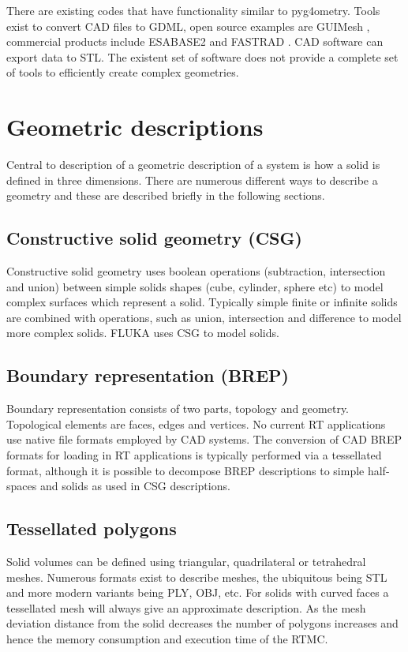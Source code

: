 \documentclass[final,5p,times,twocolumn]{elsarticle}
\begin{document}
There are existing codes that have functionality similar to pyg4ometry. Tools exist to convert CAD files to GDML, open source examples are GUIMesh \cite{GUIMesh_Pinto}, 
commercial products include ESABASE2 \cite{ESABASE2} and FASTRAD \cite{FASTRAD}. 
CAD software can export data to STL. The existent set of software does not provide a complete set of tools to efficiently create complex geometries.   

\section{Geometric descriptions} \label{sec:geometric}
Central to description of a geometric description of a system is how a solid is defined in three dimensions. There are numerous different ways to describe a
geometry and these are described briefly in the following sections.  

\subsection{Constructive solid geometry (CSG)}
Constructive solid geometry uses boolean operations (subtraction, intersection and union) between simple solids shapes (cube, cylinder, sphere etc) to model complex 
surfaces which represent a solid. Typically simple finite or infinite solids are combined with operations, such as union, intersection and difference to model more 
complex solids. FLUKA uses CSG to model solids.

\subsection{Boundary representation (BREP)}
Boundary representation consists of two parts, topology and geometry. Topological elements are faces, edges and vertices. No current RT applications use native 
file formats employed by CAD systems. The conversion of CAD BREP formats for loading in RT applications is typically performed via a tessellated format, although it 
is possible to decompose BREP descriptions to simple half-spaces and solids as used in CSG descriptions. 

\subsection{Tessellated polygons}
Solid volumes can be defined using triangular, quadrilateral or tetrahedral meshes. Numerous formats exist to describe meshes, the ubiquitous being STL and more 
modern variants being PLY, OBJ, etc. For solids with curved faces a tessellated mesh will always give an approximate description. As the mesh deviation distance from the 
solid decreases the number of polygons increases and hence the memory consumption and execution time of the RTMC. 
\end{document}

